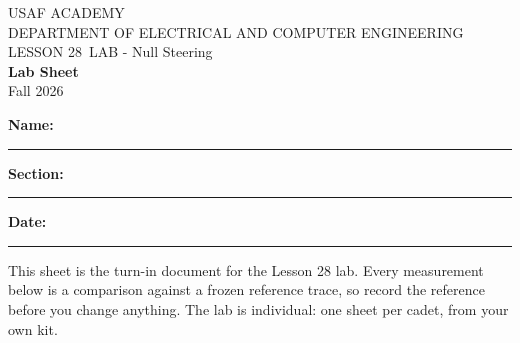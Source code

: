 \documentclass{exam}
\def\labLesson{28}
\def\thisterm{\thisTermIn}
\def\thisterm{Fall 2026}
\begin{document}
\pagestyle{headandfoot}   %



\begin{center}
USAF ACADEMY \\
DEPARTMENT OF ELECTRICAL AND COMPUTER ENGINEERING \\
LESSON \labLesson\ LAB - Null Steering \\
\textbf{Lab Sheet} \\
\thisterm \\[4mm]
\end{center}

\vspace{-4pt}
\textbf{Name:} \rule[-2pt]{2.6in}{0.4pt} \hfill
\textbf{Section:} \rule[-2pt]{0.9in}{0.4pt} \hfill
\textbf{Date:} \rule[-2pt]{1.1in}{0.4pt}

\vspace{4pt}


\vspace{2pt}

This sheet is the turn-in document for the Lesson 28 lab. Every measurement
below is a comparison against a frozen reference trace, so record the reference
before you change anything. The lab is individual: one sheet per cadet, from your own kit.
\end{document}
